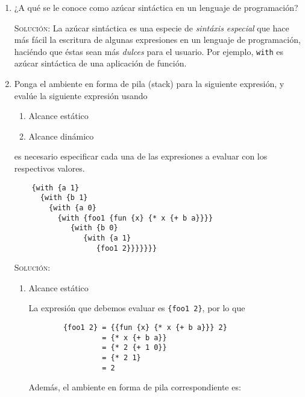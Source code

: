 \documentclass[letterpaper,11pt]{article}
\begin{document}
\begin{enumerate}
    \item ¿A qué se le conoce como azúcar sintáctica en un lenguaje de 
    programación?

    \textsc{Solución:} La azúcar sintáctica es una especie de \textit{sintáxis 
    especial} que hace más fácil la escritura de algunas expresiones en un  
    lenguaje de programación, haciéndo que éstas sean más \textit{dulces} para 
    el usuario. Por ejemplo, \texttt{with} es azúcar sintáctica de una 
    aplicación de función.

    \item Ponga el ambiente en forma de pila (stack) para la siguiente 
    expresión, y evalúe la siguiente expresión usando 
    \begin{enumerate}
        \item Alcance estático
        \item Alcance dinámico
    \end{enumerate}

    es necesario especificar cada una de las expresiones a evaluar con los 
    respectivos valores. 
    \begin{verbatim}
    {with {a 1} 
      {with {b 1} 
        {with {a 0} 
          {with {foo1 {fun {x} {* x {+ b a}}}} 
             {with {b 0} 
                {with {a 1} 
                   {foo1 2}}}}}}}
    \end{verbatim}

    \textsc{Solución:}
    \begin{enumerate}
        \item Alcance estático

        La expresión que debemos evaluar es \texttt{\{foo1 2\}}, por lo que 
        \begin{verbatim}
        {foo1 2} = {{fun {x} {* x {+ b a}}} 2}
                 = {* x {+ b a}}
                 = {* 2 {+ 1 0}}
                 = {* 2 1}
                 = 2
        \end{verbatim}

        Además, el ambiente en forma de pila correspondiente es:
        \begin{center}
            \begin{drawstack}[scale=1.6]
            \end{drawstack}
        \end{center}


\end{enumerate}
\end{enumerate}
\end{document}

